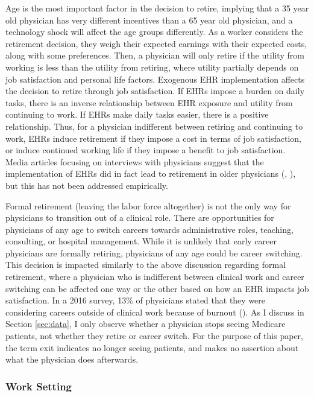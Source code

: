\documentclass[12pt]{article}
\begin{document}
Age is the most important factor in the decision to retire, implying that a 35 year old physician has very different incentives than a 65 year old physician, and a technology shock will affect the age groups differently. As a worker considers the retirement decision, they weigh their expected earnings with their expected costs, along with some preferences. Then, a physician will only retire if the utility from working is less than the utility from retiring, where utility partially depends on job satisfaction and personal life factors. Exogenous EHR implementation affects the decision to retire through job satisfaction. If EHRs impose a burden on daily tasks, there is an inverse relationship between EHR exposure and utility from continuing to work. If EHRs make daily tasks easier, there is a positive relationship. Thus, for a physician indifferent between retiring and continuing to work, EHRs induce retirement if they impose a cost in terms of job satisfaction, or induce continued working life if they impose a benefit to job satisfaction. Media articles focusing on interviews with physicians suggest that the implementation of EHRs did in fact lead to retirement in older physicians (\cite{ringel_2019}, \cite{loria_2020}), but this has not been addressed empirically. 

Formal retirement (leaving the labor force altogether) is not the only way for physicians to transition out of a clinical role. There are opportunities for physicians of any age to switch careers towards administrative roles, teaching, consulting, or hospital management. While it is unlikely that early career physicians are formally retiring, physicians of any age could be career switching. This decision is impacted similarly to the above discussion regarding formal retirement, where a physician who is indifferent between clinical work and career switching can be affected one way or the other based on how an EHR impacts job satisfaction. In a 2016 survey, 13\% of physicians stated that they were considering careers outside of clinical work because of burnout (\cite{physicians2016physicians}). As I discuss in Section \ref{sec:data}, I only observe whether a physician stops seeing Medicare patients, not whether they retire or career switch. For the purpose of this paper, the term exit indicates no longer seeing patients, and makes no assertion about what the physician does afterwards.



\subsubsection{Work Setting}
\end{document}
